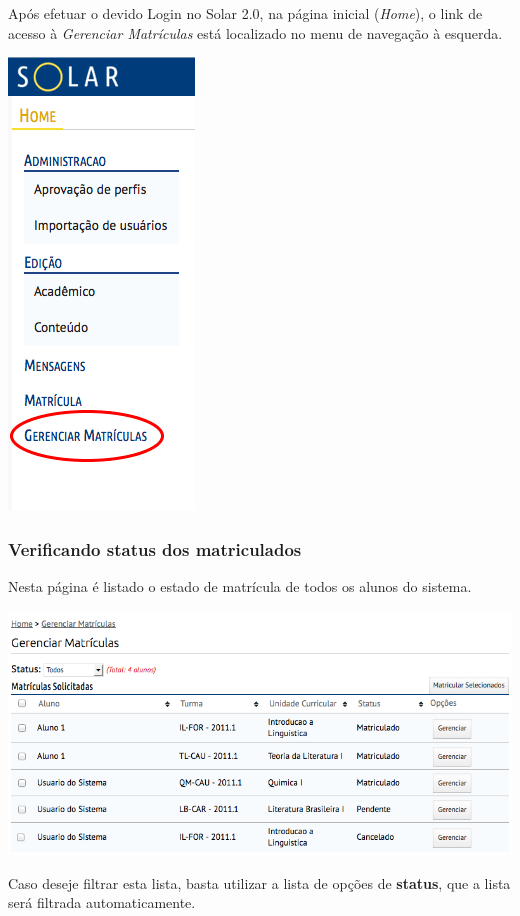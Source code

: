 \documentclass[letterpaper,10pt,english]{sphinxmanual}
\begin{document}
Após efetuar o devido Login no Solar 2.0, na página inicial (\emph{Home}), o link de acesso à \emph{Gerenciar Matrículas} está localizado no menu de navegação à esquerda.

{\hfill\includegraphics{enrollment-manage-01.png}\hfill}


\subsubsection{Verificando status dos matriculados}
\label{enrollment:verificando-status-dos-matriculados}
Nesta página é listado o estado de matrícula de todos os alunos do sistema.

{\hfill\includegraphics{enrollment-manage-02.png}\hfill}

Caso deseje filtrar esta lista, basta utilizar a lista de opções de \textbf{status}, que a lista será filtrada automaticamente.
\end{document}
